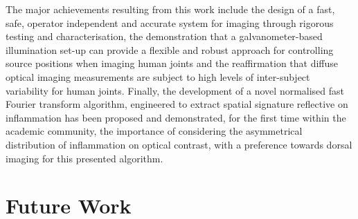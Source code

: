 \documentclass[twoside]{bhamthesis}
\theoremstyle{definition}
\begin{document}
The major achievements resulting from this work include the design of a fast, safe, operator independent and accurate system for imaging through rigorous testing and characterisation, the demonstration that a galvanometer-based illumination set-up can provide a flexible and robust approach for controlling source positions when imaging human joints and the reaffirmation that diffuse optical imaging measurements are subject to high levels of inter-subject variability for human joints. Finally, the development of a novel normalised fast Fourier transform algorithm, engineered to extract spatial signature reflective on inflammation has been proposed and demonstrated, for the first time within the academic community, the importance of considering the asymmetrical distribution of inflammation on optical contrast, with a preference towards dorsal imaging for this presented algorithm. 

\section{Future Work}
\end{document}
